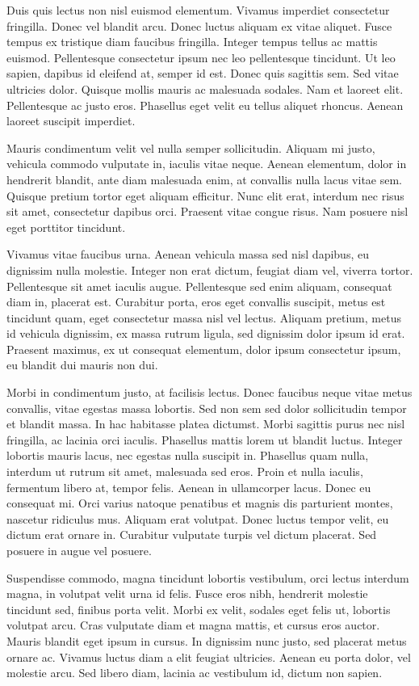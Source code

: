 Duis quis lectus non nisl euismod elementum. Vivamus imperdiet consectetur fringilla. Donec vel blandit arcu. Donec luctus aliquam ex vitae aliquet. Fusce tempus ex tristique diam faucibus fringilla. Integer tempus tellus ac mattis euismod. Pellentesque consectetur ipsum nec leo pellentesque tincidunt. Ut leo sapien, dapibus id eleifend at, semper id est. Donec quis sagittis sem. Sed vitae ultricies dolor. Quisque mollis mauris ac malesuada sodales. Nam et laoreet elit. Pellentesque ac justo eros. Phasellus eget velit eu tellus aliquet rhoncus. Aenean laoreet suscipit imperdiet.

Mauris condimentum velit vel nulla semper sollicitudin. Aliquam mi justo, vehicula commodo vulputate in, iaculis vitae neque. Aenean elementum, dolor in hendrerit blandit, ante diam malesuada enim, at convallis nulla lacus vitae sem. Quisque pretium tortor eget aliquam efficitur. Nunc elit erat, interdum nec risus sit amet, consectetur dapibus orci. Praesent vitae congue risus. Nam posuere nisl eget porttitor tincidunt.

Vivamus vitae faucibus urna. Aenean vehicula massa sed nisl dapibus, eu dignissim nulla molestie. Integer non erat dictum, feugiat diam vel, viverra tortor. Pellentesque sit amet iaculis augue. Pellentesque sed enim aliquam, consequat diam in, placerat est. Curabitur porta, eros eget convallis suscipit, metus est tincidunt quam, eget consectetur massa nisl vel lectus. Aliquam pretium, metus id vehicula dignissim, ex massa rutrum ligula, sed dignissim dolor ipsum id erat. Praesent maximus, ex ut consequat elementum, dolor ipsum consectetur ipsum, eu blandit dui mauris non dui.

Morbi in condimentum justo, at facilisis lectus. Donec faucibus neque vitae metus convallis, vitae egestas massa lobortis. Sed non sem sed dolor sollicitudin tempor et blandit massa. In hac habitasse platea dictumst. Morbi sagittis purus nec nisl fringilla, ac lacinia orci iaculis. Phasellus mattis lorem ut blandit luctus. Integer lobortis mauris lacus, nec egestas nulla suscipit in. Phasellus quam nulla, interdum ut rutrum sit amet, malesuada sed eros. Proin et nulla iaculis, fermentum libero at, tempor felis. Aenean in ullamcorper lacus. Donec eu consequat mi. Orci varius natoque penatibus et magnis dis parturient montes, nascetur ridiculus mus. Aliquam erat volutpat. Donec luctus tempor velit, eu dictum erat ornare in. Curabitur vulputate turpis vel dictum placerat. Sed posuere in augue vel posuere.

Suspendisse commodo, magna tincidunt lobortis vestibulum, orci lectus interdum magna, in volutpat velit urna id felis. Fusce eros nibh, hendrerit molestie tincidunt sed, finibus porta velit. Morbi ex velit, sodales eget felis ut, lobortis volutpat arcu. Cras vulputate diam et magna mattis, et cursus eros auctor. Mauris blandit eget ipsum in cursus. In dignissim nunc justo, sed placerat metus ornare ac. Vivamus luctus diam a elit feugiat ultricies. Aenean eu porta dolor, vel molestie arcu. Sed libero diam, lacinia ac vestibulum id, dictum non sapien.

